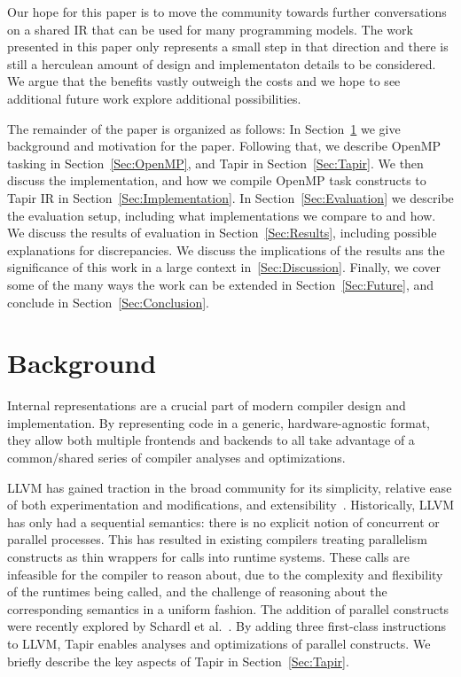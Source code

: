 \documentclass[sigconf]{acmart}
\begin{document}
Our hope for this paper is to move the community towards further conversations on a 
shared IR that can be used for many programming models. The work presented in this paper only
represents a small step in that direction and there is still a herculean amount
of design and implementaton details to be considered. We argue that the benefits vastly outweigh 
the costs and we hope to see additional future work explore additional possibilities. 


The remainder of the paper is organized as follows: In Section~\ref{Sec:Background} 
we give background and motivation for the paper. Following that, we describe OpenMP
tasking in Section~\ref{Sec:OpenMP}, and Tapir in Section~\ref{Sec:Tapir}. We then 
discuss the implementation, and how we compile OpenMP task constructs to Tapir IR in
Section~\ref{Sec:Implementation}. In Section~\ref{Sec:Evaluation} we describe the 
evaluation setup, including what implementations we compare to and how. We discuss
the results of evaluation in Section~\ref{Sec:Results}, including possible
explanations for discrepancies. We discuss the implications of the results ans the
significance of this work in a large context in~\ref{Sec:Discussion}. Finally,
we cover some of the many ways the work can be extended in
Section~\ref{Sec:Future}, and conclude in Section~\ref{Sec:Conclusion}.

\section{Background} \label{Sec:Background}

Internal representations are a crucial part of modern compiler design and implementation.  By
representing code in a generic, hardware-agnostic format, they allow both
multiple frontends and backends to all take advantage of a common/shared series of compiler 
analyses and optimizations. 

LLVM has gained traction in the broad community for its simplicity,
relative ease of both experimentation and modifications, and extensibility~\cite{lattner2004llvm}.
Historically, LLVM has only had a sequential semantics: there is no explicit notion
of concurrent or parallel processes. This has resulted in existing compilers
treating parallelism constructs as thin wrappers for calls into runtime
systems. These calls are infeasible for the compiler to reason about, due to
the complexity and flexibility of the runtimes being called, and the challenge
of reasoning about the corresponding semantics in a uniform fashion. The
addition of parallel constructs were recently explored by Schardl et
al.~\cite{tapir}. By adding three first-class instructions to LLVM, Tapir
enables analyses and optimizations of parallel constructs. We briefly describe
the key aspects of Tapir in Section~\ref{Sec:Tapir}.
\end{document}
